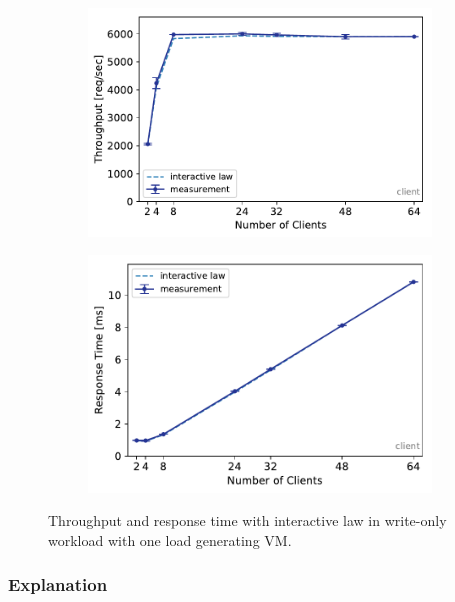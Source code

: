 \documentclass[11pt,a4paper]{article}
\begin{document}
\begin{figure}
	\begin{subfigure}[b]{.49\linewidth}
		\centering
		\includegraphics[width=\linewidth]{data/exp22_wo_tp_nc.pdf}
	\end{subfigure}\hfill
	\begin{subfigure}[b]{.49\linewidth}
		\centering
		\includegraphics[width=\linewidth]{data/exp22_wo_rt_nc.pdf}
	\end{subfigure}%
	\caption{Throughput and response time with interactive law in write-only workload with one load generating VM.}
	\label{exp22_wo_nc}
\end{figure}



\subsubsection{Explanation}
\end{document}
